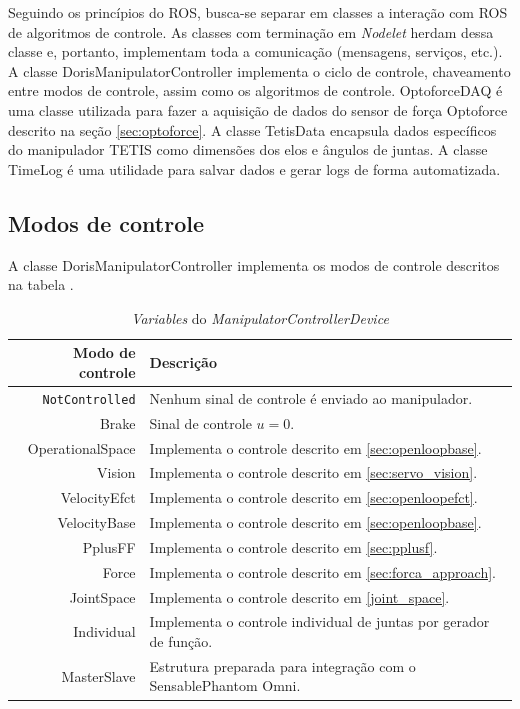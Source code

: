Seguindo os princípios do ROS, busca-se separar em classes a interação com ROS de algoritmos de controle. As classes com terminação em \textit{Nodelet} herdam dessa classe e, portanto, implementam toda a comunicação (mensagens, serviços, etc.). A classe DorisManipulatorController implementa o ciclo de controle, chaveamento entre modos de controle, assim como os algoritmos de controle. OptoforceDAQ é uma classe utilizada para fazer a aquisição de dados do sensor de força Optoforce descrito na seção \ref{sec:optoforce}. A classe TetisData encapsula dados específicos do manipulador TETIS como dimensões dos elos e ângulos de juntas. A classe TimeLog é uma utilidade para salvar dados e gerar logs de forma automatizada. 

\subsection{Modos de controle} \label{sec:ctrlmodes}

A classe DorisManipulatorController implementa os modos de controle descritos na tabela . 


\begin{table}[h!]
\centering
\caption{\textit{Variables} do \textit{ManipulatorControllerDevice}}
\label{tab:variables}
\begin{tabular}{rl} \hline
Modo de controle      	& Descrição \\ \hline
\verb|NotControlled|  	& Nenhum sinal de controle é enviado ao manipulador.\\
Brake 				  	& Sinal de controle $u = 0$. \\
OperationalSpace 	  	& Implementa o controle descrito em \ref{sec:openloopbase}. \\
Vision 				  	& Implementa o controle descrito em \ref{sec:servo_vision}. \\
VelocityEfct 			& Implementa o controle descrito em \ref{sec:openloopefct}. \\
VelocityBase 			& Implementa o controle descrito em \ref{sec:openloopbase}. \\
PplusFF 				& Implementa o controle descrito em \ref{sec:pplusf}. \\
Force 					& Implementa o controle descrito em \ref{sec:forca_approach}. \\
JointSpace 				& Implementa o controle descrito em \ref{joint_space}. \\
Individual 				& Implementa o controle individual de juntas por gerador de função. \\
MasterSlave				& Estrutura preparada para integração com o Sensable\circledR Phantom Omni. \\
\hline
\end{tabular}
\end{table}


